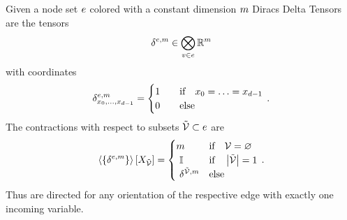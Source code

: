 \begin{example}
	Given a node set $e$ colored with a constant dimension $m$ Diracs Delta Tensors are the tensors
		\[ \delta^{e,m} \in \bigotimes_{v\in e} \mathbb{R}^{m} \]
	with coordinates
	\begin{align}
		\delta^{e,m}_{x_{0},\ldots,x_{d-1}} = 
		\begin{cases}
			1 \quad & \text{if} \quad x_{0} = \ldots = x_{d-1} \\
			0 & \text{else}
		\end{cases} \, . 
	\end{align}
	The contractions with respect to subsets $\tilde{\mathcal{V}} \subset e$ are
	\begin{align}
		\contractionof{\{\dirdeltaof{\edge,\catdim}\}}{\catvariableof{\secnodes}} = 
		\begin{cases}
			\catdim & \text{if} \quad \nodes = \varnothing \\ 
			\ones & \text{if} \quad \cardof{\secnodes} = 1\\ 
			\dirdeltaof{\secnodes,\catdim} & \text{else}
		\end{cases} \, .
	\end{align}
	Thus are directed for any orientation of the respective edge with exactly one incoming variable.
\end{example}






